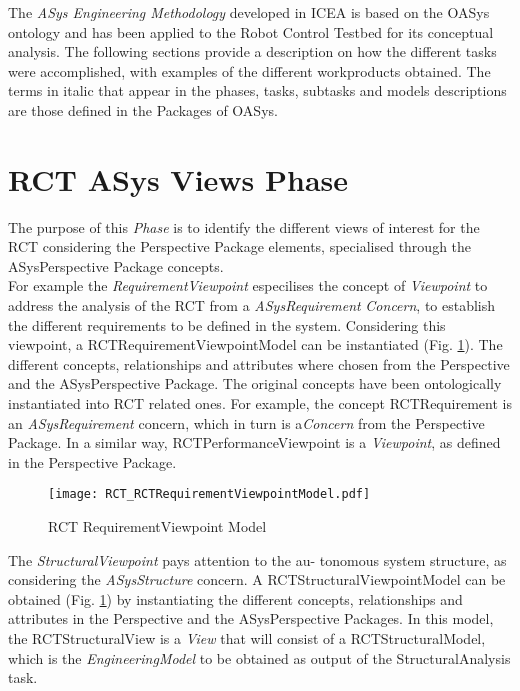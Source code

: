 

The \emph{ASys Engineering Methodology} developed in ICEA is based on the OASys ontology and has been applied to the Robot Control Testbed for its conceptual analysis. The following sections provide a description on how the different tasks were accomplished, with examples of the different workproducts obtained. The terms in italic that appear in the phases, tasks, subtasks and models descriptions are those defined in the Packages of OASys.\\

\section{RCT ASys Views Phase}
The purpose of this \emph{Phase} is to identify the different views of interest for the RCT considering the Perspective Package elements, specialised through the ASysPerspective Package concepts. \\

For example the \emph{RequirementViewpoint} especilises the concept of \emph{Viewpoint} to address the analysis of the RCT from a \emph{ASysRequirement} \emph{Concern}, to establish the different requirements to be defined in the system. Considering this viewpoint, a RCTRequirementViewpointModel can be instantiated (Fig. \ref{fig:RCTrequirementviewpointmodel}). The different concepts, relationships and attributes where chosen from the Perspective and the ASysPerspective Package. The original concepts have been ontologically instantiated into RCT related ones. For example, the concept RCTRequirement is an \emph{ASysRequirement} concern, which in turn is a\emph{Concern} from the Perspective Package. In a similar way, RCTPerformanceViewpoint is a \emph{Viewpoint}, as defined in the Perspective Package. \\

\begin{figure}[htbp]
\begin{center}
 {\texttt{[image: RCT\_RCTRequirementViewpointModel.pdf]}}
\end{center}
\caption{RCT RequirementViewpoint Model}
\label{fig:RCTrequirementviewpointmodel}
\end{figure}

The \emph{StructuralViewpoint} pays attention to the au- 
tonomous system structure, as considering the \emph{ASysStructure} concern. A RCTStructuralViewpointModel can be obtained (Fig. \ref{fig:RCTrequirementviewpointmodel}) by instantiating the different concepts, relationships and attributes in the Perspective and the ASysPerspective Packages. In this model,  the RCTStructuralView is a \emph{View} that will consist of a RCTStructuralModel, which is the \emph{EngineeringModel} to be obtained as output of the StructuralAnalysis task.\\

